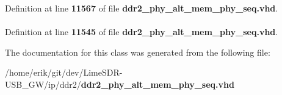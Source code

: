 Definition at line {\bf 11567} of file {\bf ddr2\+\_\+phy\+\_\+alt\+\_\+mem\+\_\+phy\+\_\+seq.\+vhd}.

\paragraph[{work}]{\hspace{0.3cm}{\ttfamily [Library]}}\label{classddr2__phy__alt__mem__phy__ctrl_a9f49de6f5eed5b4488cba6c9cdd1c215}


Definition at line {\bf 11545} of file {\bf ddr2\+\_\+phy\+\_\+alt\+\_\+mem\+\_\+phy\+\_\+seq.\+vhd}.



The documentation for this class was generated from the following file\+:\begin{DoxyCompactItemize}
\item 
/home/erik/git/dev/\+Lime\+S\+D\+R-\/\+U\+S\+B\+\_\+\+G\+W/ip/ddr2/{\bf ddr2\+\_\+phy\+\_\+alt\+\_\+mem\+\_\+phy\+\_\+seq.\+vhd}\end{DoxyCompactItemize}
